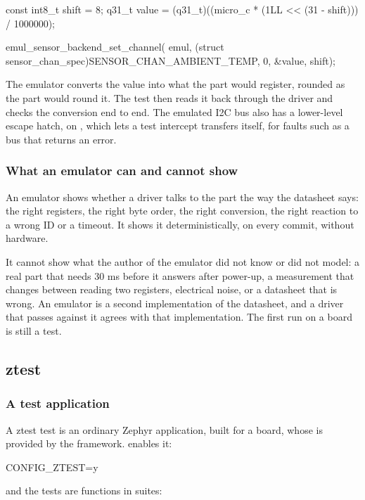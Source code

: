 \begin{ccode}
const int8_t shift = 8;
q31_t value = (q31_t)((micro_c * (1LL << (31 - shift))) / 1000000);

emul_sensor_backend_set_channel(
	emul, (struct sensor_chan_spec){SENSOR_CHAN_AMBIENT_TEMP, 0}, &value, shift);
\end{ccode}

\noindent The emulator converts the value into what the part would register, rounded as the part
would round it. The test then reads it back through the driver and checks the conversion end to end.
The emulated I2C bus also has a lower-level escape hatch,  on ,
which lets a test intercept transfers itself, for faults such as a bus that returns an error.

\subsubsection{What an emulator can and cannot show}
An emulator shows whether a driver talks to the part the way the datasheet says: the right
registers, the right byte order, the right conversion, the right reaction to a wrong ID or a
timeout. It shows it deterministically, on every commit, without hardware.

It cannot show what the author of the emulator did not know or did not model: a real part that needs
30 ms before it answers after power-up, a measurement that changes between reading two registers,
electrical noise, or a datasheet that is wrong. An emulator is a second implementation of the
datasheet, and a driver that passes against it agrees with that implementation. The first run on a
board is still a test.

\subsection{ztest}

\subsubsection{A test application}
A ztest test is an ordinary Zephyr application, built for a board, whose  is provided
by the framework.  enables it:

\begin{kconfigcode}
CONFIG_ZTEST=y
\end{kconfigcode}

\noindent and the tests are functions in suites:

